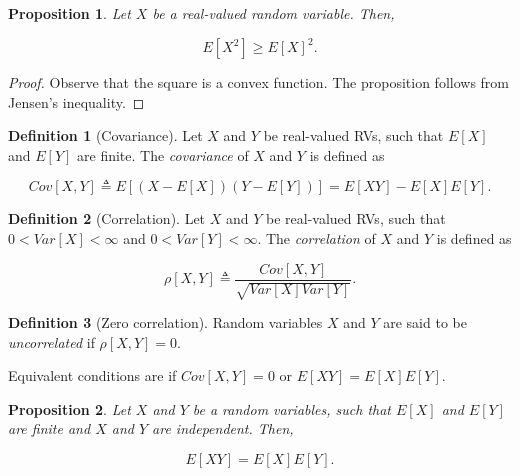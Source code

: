 \documentclass{book}
\theoremstyle{plain}%
\newtheorem{proposition}{Proposition}[section]
\theoremstyle{definition}
\newtheorem{definition}{Definition}[section]
\begin{document}
\begin{proposition}
Let $X$ be a real-valued random variable. Then,

$$E[X^2] \geq E[X]^2.$$\label{prop:varsum}
\end{proposition}

\begin{proof}
Observe that the square is a convex function. The proposition follows from Jensen's inequality.
\end{proof}

\begin{definition}[Covariance] Let $X$ and $Y$ be real-valued RVs, such that $E[X]$ and $E[Y]$ are finite.  The \emph{covariance} of $X$ and $Y$ is defined as

$$Cov[X,Y] \triangleq E[(X - E[X])(Y - E[Y])] = E[XY] - E[X]E[Y].$$
\end{definition}

\begin{definition}[Correlation]
Let $X$ and $Y$ be real-valued RVs, such that $0 < Var[X] < \infty$ and $0 < Var[Y] < \infty$. The \emph{correlation} of $X$ and $Y$ is defined as

$$\rho[X,Y] \triangleq \frac{Cov[X,Y]}{\sqrt{Var[X]Var[Y]}}.$$
\end{definition}

\begin{definition}[Zero correlation]
Random variables $X$ and $Y$ are said to be \emph{uncorrelated} if $\rho[X,Y] = 0$.

Equivalent conditions are if $Cov[X,Y] = 0$ or $E[XY] = E[X]E[Y]$.
\end{definition}

\begin{proposition}
Let $X$ and $Y$ be a random variables, such that $E[X]$ and $E[Y]$ are finite and $X$ and $Y$ are independent. Then,

$$E[XY] = E[X]E[Y].$$
\end{proposition}
\end{document}

